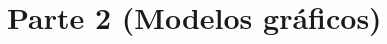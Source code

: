 \documentclass[
	spanish, %
	letterpaper, oneside
]{article}
\begin{document}
\templatePortrait

\templatePagecfg



\templateFinalcfg


\section*{Parte 2 (Modelos gráficos)}
\end{document}
